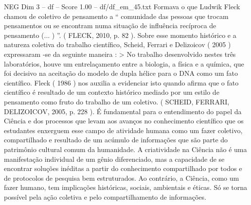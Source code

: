 \begin{textsample}{NEG Dim 3 – df – Score 1.00 – df/df\_em\_45.txt}
Formava o que Ludwik Fleck chamou de coletivo de pensamento a “ comunidade das pessoas que trocam pensamentos ou se encontram numa situação de influência recíproca de pensamento (... ) ”. ( FLECK, 2010, p. 82 ).
Sobre esse momento histórico e a natureza coletiva do trabalho científico, Scheid, Ferrari e Delizoicov ( 2005 ) expressaram -se da seguinte maneira : > No trabalho desenvolvido nestes três laboratórios, houve um entrelaçamento entre a biologia, a física e a química, que foi decisivo na aceitação do modelo de dupla hélice para o DNA como um fato científico.
Fleck ( 1986 ) nos auxilia a evidenciar isto quando afirma que o fato científico é resultado de um contexto histórico mediado por um estilo de pensamento como fruto do trabalho de um coletivo. ( SCHEID, FERRARI, DELIZOICOV, 2005, p. 228 ).
É fundamental para o entendimento do papel da Ciência e dos processos que levam aos avanços no conhecimento científico que os estudantes enxerguem esse campo de atividade humana como um fazer coletivo, compartilhado e resultado de um acúmulo de informações que são parte do patrimônio cultural comum da humanidade.
A criatividade na Ciência não é uma manifestação individual de um gênio diferenciado, mas a capacidade de se encontrar soluções inéditas a partir do conhecimento compartilhado por todos e de protocolos de pesquisa bem estruturados.
Ao contrário, a Ciência, como um fazer humano, tem implicações históricas, sociais, ambientais e éticas.
Só se torna possível pela ação coletiva e pelo compartilhamento de informações.

\end{textsample}

